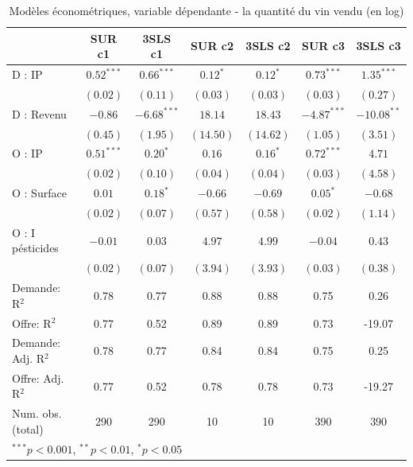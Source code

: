 \documentclass[11pt,]{article}
\begin{document}
\begin{table}[!htbp]
\begin{center}
\begin{tabular}{l c c c c c c }
\hline
 & SUR c1 & 3SLS c1 & SUR c2 & 3SLS c2 & SUR c3 & 3SLS c3 \\
\hline
D : IP              & $0.52^{***}$ & $0.66^{***}$  & $0.12^{*}$ & $0.12^{*}$ & $0.73^{***}$  & $1.35^{***}$  \\
                    & $(0.02)$     & $(0.11)$      & $(0.03)$   & $(0.03)$   & $(0.03)$      & $(0.27)$      \\
D : Revenu          & $-0.86$      & $-6.68^{***}$ & $18.14$    & $18.43$    & $-4.87^{***}$ & $-10.08^{**}$ \\
                    & $(0.45)$     & $(1.95)$      & $(14.50)$  & $(14.62)$  & $(1.05)$      & $(3.51)$      \\
O : IP              & $0.51^{***}$ & $0.20^{*}$    & $0.16$     & $0.16^{*}$ & $0.72^{***}$  & $4.71$        \\
                    & $(0.02)$     & $(0.10)$      & $(0.04)$   & $(0.04)$   & $(0.03)$      & $(4.58)$      \\
O : Surface         & $0.01$       & $0.18^{*}$    & $-0.66$    & $-0.69$    & $0.05^{*}$    & $-0.68$       \\
                    & $(0.02)$     & $(0.07)$      & $(0.57)$   & $(0.58)$   & $(0.02)$      & $(1.14)$      \\
O : I pésticides    & $-0.01$      & $0.03$        & $4.97$     & $4.99$     & $-0.04$       & $0.43$        \\
                    & $(0.02)$     & $(0.07)$      & $(3.94)$   & $(3.93)$   & $(0.03)$      & $(0.38)$      \\
\hline
Demande: R$^2$      & 0.78         & 0.77          & 0.88       & 0.88       & 0.75          & 0.26          \\
Offre: R$^2$        & 0.77         & 0.52          & 0.89       & 0.89       & 0.73          & -19.07        \\
Demande: Adj. R$^2$ & 0.78         & 0.77          & 0.84       & 0.84       & 0.75          & 0.25          \\
Offre: Adj. R$^2$   & 0.77         & 0.52          & 0.78       & 0.78       & 0.73          & -19.27        \\
Num. obs. (total)   & 290          & 290           & 10         & 10         & 390           & 390           \\
\hline
\multicolumn{7}{l}{\scriptsize{$^{***}p<0.001$, $^{**}p<0.01$, $^*p<0.05$}}
\end{tabular}
\caption{Modèles économétriques, variable dépendante - la quantité du vin vendu (en log)}
\label{table : sur et 3sls clusters}
\end{center}
\end{table}
\end{document}
